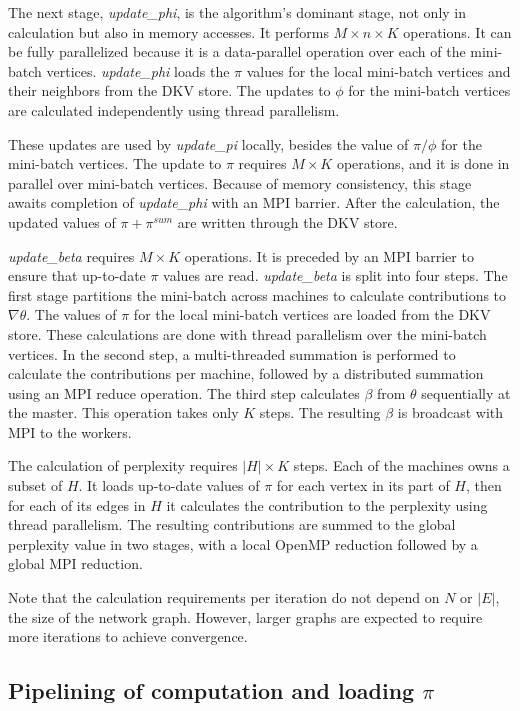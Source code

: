 The next stage, \textit{update\_phi}, is the algorithm's dominant stage, not
only in calculation but also in memory accesses. It performs $M\times n\times
K$ operations. It can be fully parallelized because it is a data-parallel
operation over each of the mini-batch vertices. \textit{update\_phi} loads the
$\pi$ values for the local mini-batch vertices and their neighbors from the
DKV store. The updates to $\phi$ for the mini-batch vertices are calculated
independently using thread parallelism.

These updates are used by \textit{update\_pi} locally, besides the value of
$\pi/\phi$ for the mini-batch vertices. The update to $\pi$ requires $M\times
K$ operations, and it is done in parallel over mini-batch vertices. Because of
memory consistency, this stage awaits completion of \textit{update\_phi} with
an MPI barrier. After the calculation, the updated values of $\pi+\pi^{sum}$
are written through the DKV store.

\textit{update\_beta} requires $M\times K$ operations. It is preceded by an MPI
barrier to ensure that up-to-date $\pi$ values are read. \textit{update\_beta}
is split into four steps. The first stage partitions the mini-batch across
machines to calculate contributions to $\nabla\theta$. The values of $\pi$ for
the local mini-batch vertices are loaded from the DKV store. These calculations
are done with thread parallelism over the mini-batch vertices. In the second step,
a multi-threaded summation is performed to calculate the contributions per
machine, followed by a distributed summation using an MPI reduce operation. The
third step calculates $\beta$ from $\theta$ sequentially at the master. This
operation takes only $K$ steps. The resulting $\beta$ is broadcast with MPI
to the workers.

The calculation of perplexity requires $|H|\times K$ steps. Each of the
machines owns a subset of $H$. It loads up-to-date values of $\pi$ for each
vertex in its part of $H$, then for each of its edges in $H$ it calculates the
contribution to the perplexity using thread parallelism. The resulting
contributions are summed to the global perplexity value in two stages,
with a local OpenMP reduction followed by a global MPI reduction.

Note that the calculation requirements per iteration do not depend
on $N$ or $|E|$, the size of the network graph. However, larger graphs are
expected to require more iterations to achieve convergence.

\subsection{Pipelining of computation and loading $\pi$}

